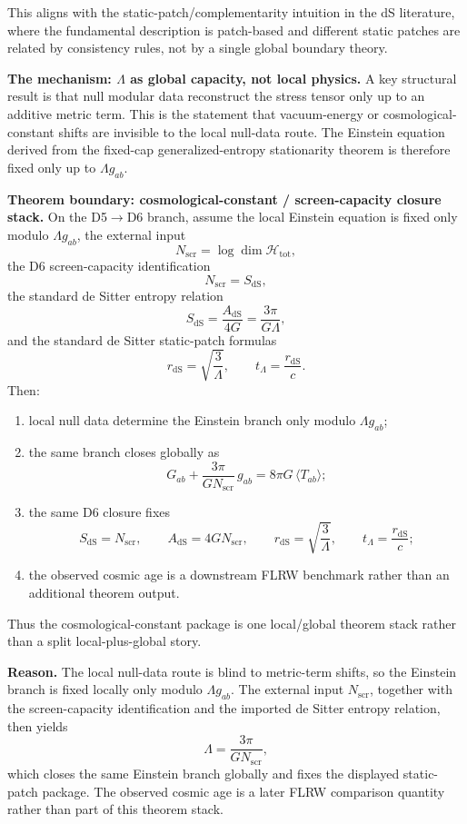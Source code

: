 This aligns with the static-patch/complementarity intuition in the dS literature, where the fundamental description is patch-based and different static patches are related by consistency rules, not by a single global boundary theory.

\textbf{The mechanism: \(\Lambda\) as global capacity, not local physics.} A key structural result is that null modular data reconstruct the stress tensor only up to an additive metric term. This is the statement that vacuum-energy or cosmological-constant shifts are invisible to the local null-data route. The Einstein equation derived from the fixed-cap generalized-entropy stationarity theorem is therefore fixed only up to \(\Lambda g_{ab}\).

\textbf{Theorem boundary: cosmological-constant / screen-capacity closure stack.}
On the D5\(\to\)D6 branch, assume the local Einstein equation is fixed only modulo \(\Lambda g_{ab}\), the external input
\[
N_{\mathrm{scr}}=\log \dim \mathcal H_{\mathrm{tot}},
\]
the D6 screen-capacity identification
\[
N_{\mathrm{scr}}=S_{\mathrm{dS}},
\]
\noindent the standard de Sitter entropy relation
\[
S_{\mathrm{dS}}=\frac{A_{\mathrm{dS}}}{4G}=\frac{3\pi}{G\Lambda},
\]
and the standard de Sitter static-patch formulas
\[
r_{\mathrm{dS}}=\sqrt{\frac{3}{\Lambda}},
\qquad
t_\Lambda=\frac{r_{\mathrm{dS}}}{c}.
\]
Then:
\begin{enumerate}[leftmargin=2em]
\item local null data determine the Einstein branch only modulo \(\Lambda g_{ab}\);
\item the same branch closes globally as
\[
G_{ab}+\frac{3\pi}{G N_{\mathrm{scr}}}\,g_{ab}=8\pi G\,\langle T_{ab}\rangle;
\]
\item the same D6 closure fixes
\[
S_{\mathrm{dS}}=N_{\mathrm{scr}},
\qquad
A_{\mathrm{dS}}=4G N_{\mathrm{scr}},
\qquad
r_{\mathrm{dS}}=\sqrt{\frac{3}{\Lambda}},
\qquad
t_\Lambda=\frac{r_{\mathrm{dS}}}{c};
\]
\item the observed cosmic age is a downstream FLRW benchmark rather than an additional theorem output.
\end{enumerate}
Thus the cosmological-constant package is one local/global theorem stack rather than a split local-plus-global story.

\textbf{Reason.}
The local null-data route is blind to metric-term shifts, so the Einstein branch is fixed locally
only modulo \(\Lambda g_{ab}\). The external input \(N_{\mathrm{scr}}\), together with the
screen-capacity identification and the imported de Sitter entropy relation, then yields
\[
\Lambda=\frac{3\pi}{G N_{\mathrm{scr}}},
\]
which closes the same Einstein branch globally and fixes the displayed static-patch package. The
observed cosmic age is a later FLRW comparison quantity rather than part of this theorem stack.

